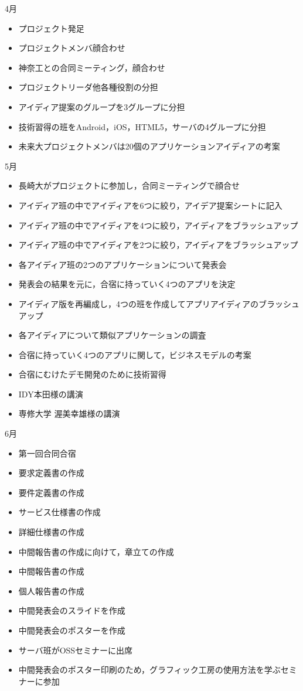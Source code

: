 4月
\begin{itemize}
\item プロジェクト発足
\item プロジェクトメンバ顔合わせ
\item 神奈工との合同ミーティング，顔合わせ
\item プロジェクトリーダ他各種役割の分担
\item アイディア提案のグループを3グループに分担
\item 技術習得の班をAndroid，iOS，HTML5，サーバの4グループに分担
\item 未来大プロジェクトメンバは20個のアプリケーションアイディアの考案
\end{itemize}
5月
\begin{itemize}
\item 長崎大がプロジェクトに参加し，合同ミーティングで顔合せ
\item アイディア班の中でアイディアを6つに絞り，アイデア提案シートに記入
\item アイディア班の中でアイディアを4つに絞り，アイディアをブラッシュアップ
\item アイディア班の中でアイディアを2つに絞り，アイディアをブラッシュアップ
\item 各アイディア班の2つのアプリケーションについて発表会
\item 発表会の結果を元に，合宿に持っていく4つのアプリを決定
\item アイディア版を再編成し，4つの班を作成してアプリアイディアのブラッシュアップ
\item 各アイディアについて類似アプリケーションの調査
\item 合宿に持っていく4つのアプリに関して，ビジネスモデルの考案
\item 合宿にむけたデモ開発のために技術習得
\item IDY本田様の講演
\item 専修大学 渥美幸雄様の講演
\end{itemize}
6月
\begin{itemize}
\item 第一回合同合宿
\item 要求定義書の作成
\item 要件定義書の作成
\item サービス仕様書の作成
\item 詳細仕様書の作成
\item 中間報告書の作成に向けて，章立ての作成
\item 中間報告書の作成
\item 個人報告書の作成
\item 中間発表会のスライドを作成
\item 中間発表会のポスターを作成
\item サーバ班がOSSセミナーに出席
\item 中間発表会のポスター印刷のため，グラフィック工房の使用方法を学ぶセミナーに参加
\end{itemize}
